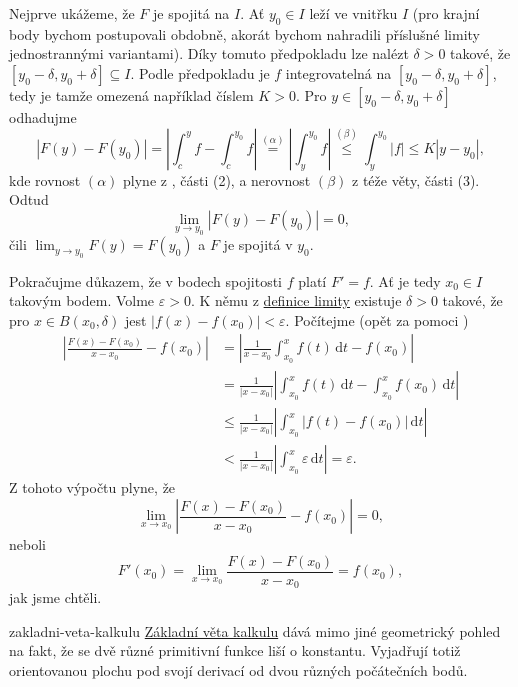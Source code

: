 \begin{thmproof}
 Nejprve ukážeme, že $F$ je spojitá na $I$. Ať $y_0 \in I$ leží ve vnitřku $I$
 (pro krajní body bychom postupovali obdobně, akorát bychom nahradili příslušné
 limity jednostrannými variantami). Díky tomuto předpokladu lze nalézt
 $\delta>0$ takové, že $[y_0-\delta,y_0+\delta] \subseteq I$. Podle předpokladu
 je $f$ integrovatelná na $[y_0-\delta,y_0+\delta]$, tedy je tamže omezená
 například číslem $K>0$. Pro $y \in [y_0-\delta,y_0+\delta]$ odhadujme
 \[
  |F(y) - F(y_0)| = \left| \int_{c}^{y} f - \int_{c}^{y_0} f \right|
  \overset{(\alpha)}{=} \left| \int_{y}^{y_0} f \right| \overset{(\beta)}{ \leq
  } \int_{y}^{y_0} |f| \leq K|y-y_0|,
 \]
 kde rovnost $(\alpha)$ plyne z
 , části (2), a nerovnost
 $(\beta)$ z téže věty, části (3). Odtud
 \[
  \lim_{y \to y_0} |F(y) - F(y_0)| = 0,
 \]
 čili $\lim_{y \to y_0} F(y) = F(y_0)$ a $F$ je spojitá v $y_0$.

 Pokračujme důkazem, že v bodech spojitosti $f$ platí $F' = f$. Ať je tedy
 $x_0 \in I$ takovým bodem. Volme $\varepsilon>0$. K němu z
 \hyperref[def:oboustranna-limita-funkce]{definice limity} existuje $\delta>0$
 takové, že pro $x \in B(x_0,\delta)$ jest $|f(x) - f(x_0)|<\varepsilon$.
 Počítejme (opět za pomoci
 )
 \begin{align*}
  \left| \frac{F(x) - F(x_0)}{x - x_0} - f(x_0) \right| 
  &= \left|\frac{1}{x-x_0} \int_{x_0}^{x} f(t) \, \mathrm{d}t - f(x_0) \right|
  \\
  &= \frac{1}{|x-x_0|} \left| \int_{x_0}^{x} f(t) \, \mathrm{d}t -
  \int_{x_0}^{x} f(x_0) \, \mathrm{d}t \right| \\
  & \leq \frac{1}{|x-x_0|} \left| \int_{x_0}^{x} |f(t) - f(x_0)| \, \mathrm{d}t
  \right| \\
  &< \frac{1}{|x-x_0|} \left| \int_{x_0}^{x} \varepsilon \, \mathrm{d}t \right|
  = \varepsilon.
 \end{align*}
 Z tohoto výpočtu plyne, že
 \[
  \lim_{x \to x_0} \left| \frac{F(x) - F(x_0)}{x - x_0} - f(x_0) \right| = 0,
 \]
 neboli
 \[
  F'(x_0) = \lim_{x \to x_0} \frac{F(x) - F(x_0)}{x - x_0} = f(x_0),
 \]
 jak jsme chtěli.
\end{thmproof}

\begin{remark}{}{zakladni-veta-kalkulu}
 \hyperref[thm:zakladni-veta-kalkulu]{Základní věta kalkulu} dává mimo jiné
 geometrický pohled na fakt, že se dvě různé primitivní funkce liší o konstantu.
 Vyjadřují totiž orientovanou plochu pod svojí derivací od dvou různých
 počátečních bodů.
\end{remark}


